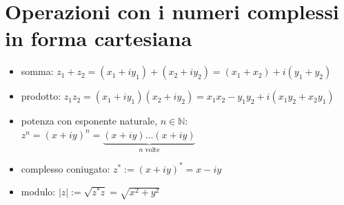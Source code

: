 \documentclass[letterpaper,10pt,italian]{jupyterBook}
\begin{document}
\section{Operazioni con i numeri complessi \sphinxhyphen{} in forma cartesiana}
\label{\detokenize{ch/algebra/complex-algebra:operazioni-con-i-numeri-complessi-in-forma-cartesiana}}\label{\detokenize{ch/algebra/complex-algebra:math-hs-algebra-complex-operations-0}}\begin{itemize}
\item {} 
\sphinxAtStartPar
somma: \(z_1 + z_2 = (x_1 + i y_1) + (x_2 + i y_2) = (x_1 + x_2) + i (y_1 + y_2)\)

\item {} 
\sphinxAtStartPar
prodotto: \(z_1 z_2 = (x_1 + i y_1)(x_2 + i y_2) = x_1 x_2 - y_1 y_2 + i (x_1 y_2 + x_2 y_1)\)

\item {} 
\sphinxAtStartPar
potenza con esponente naturale, \(n \in \mathbb{N}\): \(z^n = (x + i y)^n = \underbrace{(x+iy) \dots (x+iy)}_{n \text{ volte}}\)

\item {} 
\sphinxAtStartPar
complesso coniugato: \(z^* := (x+iy)^* = x - i y\)

\item {} 
\sphinxAtStartPar
modulo: \(|z| := \sqrt{z^* z} = \sqrt{x^2 + y^2}\)

\end{itemize}
\label{ch/algebra/complex-algebra:complex-first-operations}
\end{document}
